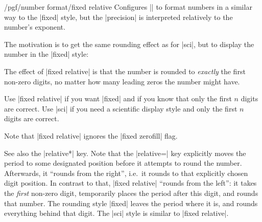 \begin{keylist}{/pgf/number format/fixed relative}
  Configures |\pgfmathprintnumber| to format numbers in a similar way
  to the |fixed| style, but the |precision| is interpreted relatively
  to the number's exponent. 

  The motivation is to get the same rounding effect as for |sci|, but
  to display the number in the |fixed| style: 
\begin{codeexample}[]
\hspace{1em}
\hspace{1em}
\hspace{1em}
\hspace{1em}
\hspace{1em}
\hspace{1em}
\hspace{1em}
\end{codeexample}
	
  The effect of |fixed relative| is that the number is rounded to
  \emph{exactly} the first  non-zero digits, no matter
  how many leading zeros the number might have. 

  Use |fixed relative| if you want |fixed| and if you know that only
  the first $n$ digits are correct. Use |sci| if you need a scientific
  display style and only the first $n$ digits are correct. 

  Note that |fixed relative| ignores the |fixed zerofill| flag.

  See also the |relative*| key. Note that the
  |relative=| key explicitly moves the period to some
  designated position before it attempts to round the
  number. Afterwards, it ``rounds from the right'', i.e.\ it rounds to
  that explicitly chosen digit position. In contrast to that,
  |fixed relative| ``rounds from the left'': it takes the \emph{first}
  non-zero digit, temporarily places the period after this digit, and
  rounds that number. The rounding style |fixed| leaves the period
  where it is, and rounds everything behind that digit. The |sci|
  style is similar to |fixed relative|. 
\end{keylist}


